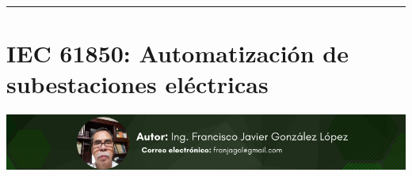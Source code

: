 \documentclass[12pt,spanish,Letterpaper,openany]{book}
\newcommand{\HRule}{\begin{center}\rule{0.5\linewidth}{0.2mm}\end{center}}
\begin{document}
\medskip

\HRule

\medskip

\hypertarget{fgonzales}{%
\chapter{IEC 61850: Automatización de subestaciones eléctricas}\label{fgonzales}}

\begin{center}\includegraphics[width=1\linewidth]{images/gonzalez} \end{center}
\end{document}
